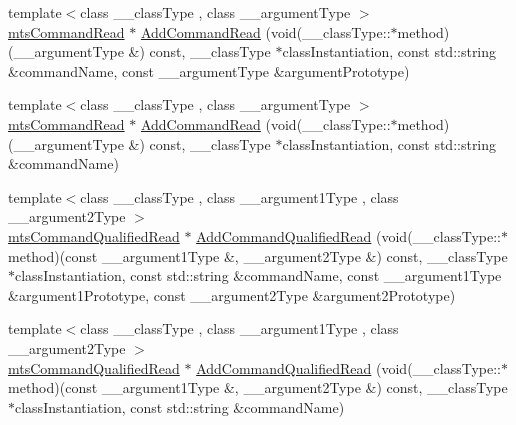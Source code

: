 {\bf }\par
\begin{DoxyCompactItemize}
\item 
{\footnotesize template$<$class \-\_\-\-\_\-class\-Type , class \-\_\-\-\_\-argument\-Type $>$ }\\\hyperlink{classmts_command_read}{mts\-Command\-Read} $\ast$ \hyperlink{classmts_interface_provided_aa4dfb77040a8ee9fd35ff5220c63d7a1}{Add\-Command\-Read} (void(\-\_\-\-\_\-class\-Type\-::$\ast$method)(\-\_\-\-\_\-argument\-Type \&) const, \-\_\-\-\_\-class\-Type $\ast$class\-Instantiation, const std\-::string \&command\-Name, const \-\_\-\-\_\-argument\-Type \&argument\-Prototype)
\item 
{\footnotesize template$<$class \-\_\-\-\_\-class\-Type , class \-\_\-\-\_\-argument\-Type $>$ }\\\hyperlink{classmts_command_read}{mts\-Command\-Read} $\ast$ \hyperlink{classmts_interface_provided_a827bfe0c2f67ef632c709e95805d9bc0}{Add\-Command\-Read} (void(\-\_\-\-\_\-class\-Type\-::$\ast$method)(\-\_\-\-\_\-argument\-Type \&) const, \-\_\-\-\_\-class\-Type $\ast$class\-Instantiation, const std\-::string \&command\-Name)
\end{DoxyCompactItemize}

{\bf }\par
\begin{DoxyCompactItemize}
\item 
{\footnotesize template$<$class \-\_\-\-\_\-class\-Type , class \-\_\-\-\_\-argument1\-Type , class \-\_\-\-\_\-argument2\-Type $>$ }\\\hyperlink{classmts_command_qualified_read}{mts\-Command\-Qualified\-Read} $\ast$ \hyperlink{classmts_interface_provided_ad9101b39fcf98fe7bf80059266089a7f}{Add\-Command\-Qualified\-Read} (void(\-\_\-\-\_\-class\-Type\-::$\ast$method)(const \-\_\-\-\_\-argument1\-Type \&, \-\_\-\-\_\-argument2\-Type \&) const, \-\_\-\-\_\-class\-Type $\ast$class\-Instantiation, const std\-::string \&command\-Name, const \-\_\-\-\_\-argument1\-Type \&argument1\-Prototype, const \-\_\-\-\_\-argument2\-Type \&argument2\-Prototype)
\item 
{\footnotesize template$<$class \-\_\-\-\_\-class\-Type , class \-\_\-\-\_\-argument1\-Type , class \-\_\-\-\_\-argument2\-Type $>$ }\\\hyperlink{classmts_command_qualified_read}{mts\-Command\-Qualified\-Read} $\ast$ \hyperlink{classmts_interface_provided_afca3560989edba15be8901d61958ca19}{Add\-Command\-Qualified\-Read} (void(\-\_\-\-\_\-class\-Type\-::$\ast$method)(const \-\_\-\-\_\-argument1\-Type \&, \-\_\-\-\_\-argument2\-Type \&) const, \-\_\-\-\_\-class\-Type $\ast$class\-Instantiation, const std\-::string \&command\-Name)
\end{DoxyCompactItemize}

